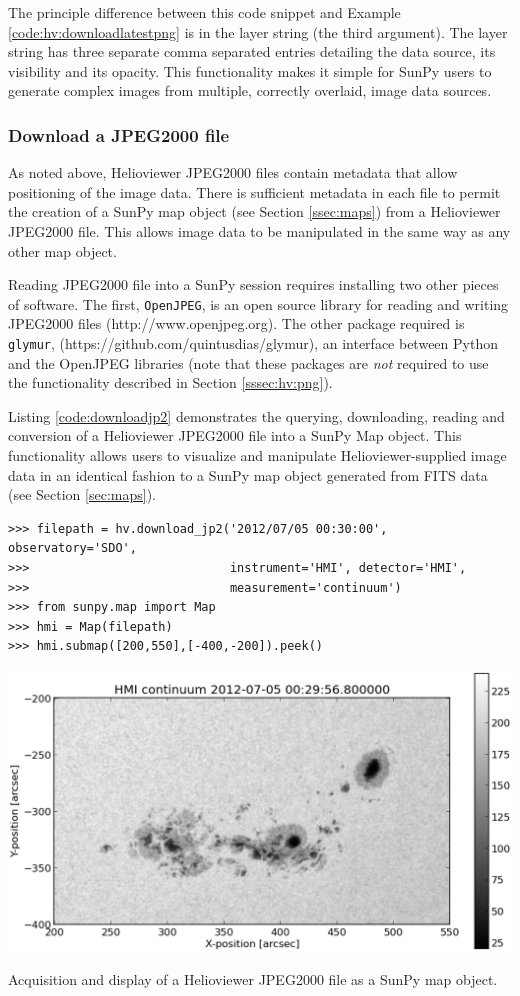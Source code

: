The principle difference between this code snippet and Example
\ref{code:hv:downloadlatestpng} is in the layer string (the third
argument).  The layer string has three separate comma separated
entries detailing the data source, its visibility and its opacity.
This functionality makes it simple for SunPy users to generate complex
images from multiple, correctly overlaid, image data sources.

\subsubsection{Download a JPEG2000 file}\label{sssec:hv:jp}

As noted above, Helioviewer JPEG2000 files contain metadata that allow
positioning of the image data.  There is sufficient metadata in each
file to permit the creation of a SunPy map object (see Section
\ref{ssec:maps}) from a Helioviewer JPEG2000 file.  This allows image
data to be manipulated in the same way as any other map object.

Reading JPEG2000 file into a SunPy session requires installing two
other pieces of software. The first, \texttt{OpenJPEG}, is an open
source library for reading and writing JPEG2000 files
(http://www.openjpeg.org).  The other package required is
\texttt{glymur}, (https://github.com/quintusdias/glymur), an interface
between Python and the OpenJPEG libraries (note that these packages
are {\it not} required to use the functionality described in Section
\ref{sssec:hv:png}).

Listing \ref{code:downloadjp2} demonstrates the querying, downloading,
reading and conversion of a Helioviewer JPEG2000 file into a SunPy Map
object.  This functionality allows users to visualize and manipulate
Helioviewer-supplied image data in an identical fashion to a SunPy map
object generated from FITS data (see Section \ref{sec:maps}).

\begin{listing}[H]
\begin{verbatim}
>>> filepath = hv.download_jp2('2012/07/05 00:30:00', observatory='SDO',
>>>                            instrument='HMI', detector='HMI', 
>>>                            measurement='continuum')
>>> from sunpy.map import Map
>>> hmi = Map(filepath)
>>> hmi.submap([200,550],[-400,-200]).peek()
\end{verbatim}
\begin{center}
\includegraphics[width=0.8\columnwidth]{helioviewer_hmi_continuum_jp2_to_map}
\end{center}
\caption{Acquisition and display of a Helioviewer JPEG2000 file as a
  SunPy map object.}
\label{code:downloadjp2}
\end{listing}